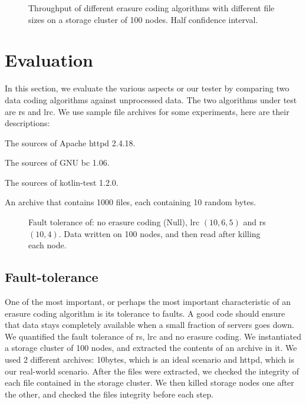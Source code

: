 \begin{figure*}
    \centering
    
    \caption{Throughput of different erasure coding algorithms with different file sizes on a storage cluster of 100 nodes. Half confidence interval.}
    \label{fig:throughput-plot}
\end{figure*}

\section{Evaluation}
\label{sec:evaluation}

In this section, we evaluate the various aspects or our tester by comparing two data coding algorithms against unprocessed data.
The two algorithms under test are \acf{rs} and \acf{lrc}.
We use sample file archives for some experiments, here are their descriptions:

\begin{description}
    \item[httpd] The sources of Apache httpd 2.4.18.
    \item[bc] The sources of GNU bc 1.06.
    \item[kotlin-test] The sources of kotlin-test 1.2.0.
    \item[10bytes] An archive that contains \num{1000} files, each containing 10 random bytes.
\end{description}

\begin{figure}
    \centering
    
    \caption{Fault tolerance of: no erasure coding (Null), \acl{lrc} $\left(10,6,5\right)$ and \acl{rs} $\left(10,4\right)$. Data written on 100 nodes, and then read after killing each node.}
    \label{fig:checksum-plot}
\end{figure}

\subsection{Fault-tolerance}
\label{subsec:fault-tolerance}

One of the most important, or perhaps the most important characteristic of an erasure coding algorithm is its tolerance to faults.
A good code should ensure that data stays completely available when a small fraction of servers goes down.
We quantified the fault tolerance of \acf{rs}, \acf{lrc} and no erasure coding.
We instantiated a storage cluster of 100 nodes, and extracted the contents of an archive in it.
We used 2 different archives: 10bytes, which is an ideal scenario and httpd, which is our real-world scenario.
After the files were extracted, we checked the integrity of each file contained in the storage cluster.
We then killed storage nodes one after the other, and checked the files integrity before each step.

